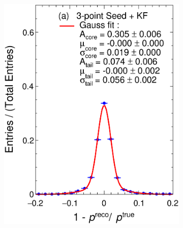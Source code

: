 \begin{figure}[t]
     \centering
     \begin{subfigure}{0.32\textwidth}
         \centering
         \includegraphics[width=\textwidth]{figures/ch4-KF_NDGArLite/MC/ALICE+KF/pResKF_doublegauss.eps}
         \caption{}
         \label{fig:respKF_GArLite_ALICE+KF}
     \end{subfigure}
     \begin{subfigure}{0.32\textwidth}
         \centering

\end{subfigure}
\end{figure}
